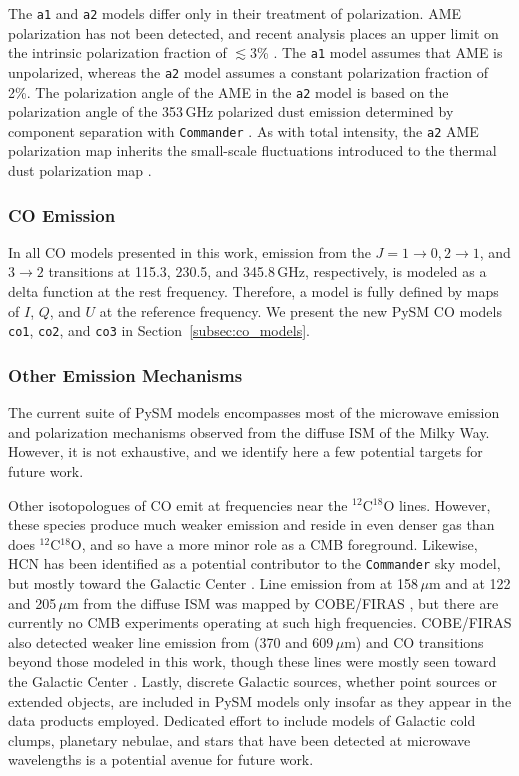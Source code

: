 \documentclass[twocolumn]{aastex631}
\begin{document}
The \texttt{a1} and \texttt{a2} models differ only in their treatment of polarization. AME polarization has not been detected, and recent analysis places an upper limit on the intrinsic polarization fraction of $\lesssim3$\% \citep{Herman:2023}. The \texttt{a1} model assumes that AME is unpolarized, whereas the \texttt{a2} model assumes a constant polarization fraction of 2\%. The polarization angle of the AME in the \texttt{a2} model is based on the polarization angle of the 353\,GHz polarized dust emission determined by component separation with \texttt{Commander} \citep{planck2014-a12}. As with total intensity, the \texttt{a2} AME polarization map inherits the small-scale fluctuations introduced to the thermal dust polarization map \citep[see][for details]{Thorne:2017}.

\subsubsection{CO Emission}
In all CO models presented in this work, emission from the $J = 1\rightarrow0, 2\rightarrow1$, and $3\rightarrow2$ transitions at 115.3, 230.5, and 345.8\,GHz, respectively, is modeled as a delta function at the rest frequency. Therefore, a model is fully defined by maps of $I$, $Q$, and $U$ at the reference frequency. We present the new PySM CO models \texttt{co1}, \texttt{co2}, and \texttt{co3} in Section~\ref{subsec:co_models}.

\subsubsection{Other Emission Mechanisms}
The current suite of PySM models encompasses most of the microwave emission and polarization mechanisms observed from the diffuse ISM of the Milky Way. However, it is not exhaustive, and we identify here a few potential targets for future work.

Other isotopologues of CO emit at frequencies near the $^{12}$C$^{18}$O lines. However, these species produce much weaker emission and reside in even denser gas than does $^{12}$C$^{18}$O, and so have a more minor role as a CMB foreground. Likewise, HCN has been identified as a potential contributor to the \texttt{Commander} sky model, but mostly toward the Galactic Center \citep{planck2014-a12}. Line emission from  at 158\,$\mu$m and  at 122 and 205\,$\mu$m from the diffuse ISM was mapped by COBE/FIRAS \citep{Bennett:1994}, but there are currently no CMB experiments operating at such high frequencies. COBE/FIRAS also detected weaker line emission from  (370 and 609\,$\mu$m) and CO transitions beyond those modeled in this work, though these lines were mostly seen toward the Galactic Center \citep{Bennett:1994}. Lastly, discrete Galactic sources, whether point sources or extended objects, are included in PySM models only insofar as they appear in the data products employed. Dedicated effort to include models of Galactic cold clumps, planetary nebulae, and stars that have been detected at microwave wavelengths is a potential avenue for future work.
\end{document}

